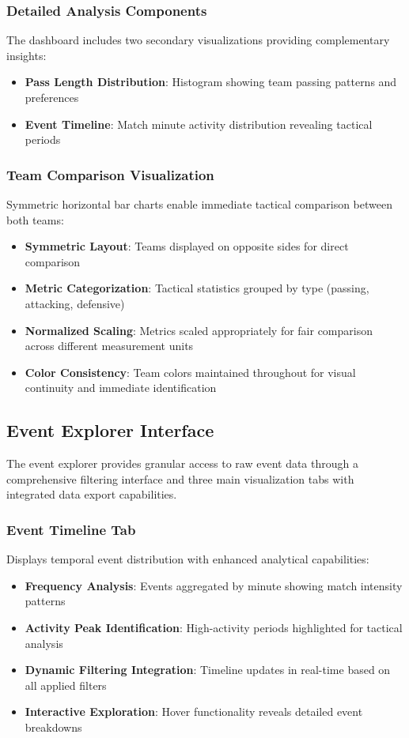 \documentclass[12pt,a4paper]{article}
\begin{document}
\subsubsection{Detailed Analysis Components}
The dashboard includes two secondary visualizations providing complementary insights:
\begin{itemize}
    \item \textbf{Pass Length Distribution}: Histogram showing team passing patterns and preferences
    \item \textbf{Event Timeline}: Match minute activity distribution revealing tactical periods
\end{itemize}

\subsubsection{Team Comparison Visualization}
Symmetric horizontal bar charts enable immediate tactical comparison between both teams:
\begin{itemize}
    \item \textbf{Symmetric Layout}: Teams displayed on opposite sides for direct comparison
    \item \textbf{Metric Categorization}: Tactical statistics grouped by type (passing, attacking, defensive)
    \item \textbf{Normalized Scaling}: Metrics scaled appropriately for fair comparison across different measurement units
    \item \textbf{Color Consistency}: Team colors maintained throughout for visual continuity and immediate identification
\end{itemize}


\subsection{Event Explorer Interface}
\label{sec:event_explorer}

The event explorer provides granular access to raw event data through a comprehensive filtering interface and three main visualization tabs with integrated data export capabilities.


\subsubsection{Event Timeline Tab}
Displays temporal event distribution with enhanced analytical capabilities:
\begin{itemize}
    \item \textbf{Frequency Analysis}: Events aggregated by minute showing match intensity patterns
    \item \textbf{Activity Peak Identification}: High-activity periods highlighted for tactical analysis
    \item \textbf{Dynamic Filtering Integration}: Timeline updates in real-time based on all applied filters
    \item \textbf{Interactive Exploration}: Hover functionality reveals detailed event breakdowns
\end{itemize}
\end{document}
